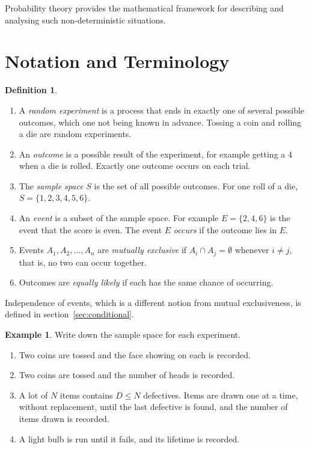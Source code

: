 \documentclass[12pt,a4paper]{report}
\theoremstyle{definition}
\newtheorem{definition}[thm]{Definition}
\newtheorem{example}[thm]{Example}
\theoremstyle{plain}
\theoremstyle{definition}
\begin{document}
Probability theory provides the mathematical framework for describing and
analysing such non-deterministic situations.

\section{Notation and Terminology}

\begin{definition}
\label{def:terms}
\begin{enumerate}
\item A \emph{random experiment} is a process that ends in exactly one of several
possible outcomes, which one not being known in advance. Tossing a coin and rolling
a die are random experiments.
\item An \emph{outcome} is a possible result of the experiment, for example getting
a $4$ when a die is rolled. Exactly one outcome occurs on each trial.
\item The \emph{sample space} $S$ is the set of all possible outcomes. For one roll of
a die, $S = \{1, 2, 3, 4, 5, 6\}$.
\item An \emph{event} is a subset of the sample space. For example
$E = \{2, 4, 6\}$ is the event that the score is even. The event $E$
\emph{occurs} if the outcome lies in $E$.
\item Events $A_1, A_2, \dots, A_n$ are \emph{mutually exclusive} if
$A_i\cap A_j = \emptyset$ whenever $i\ne j$, that is, no two can occur together.
\item Outcomes are \emph{equally likely} if each has the same chance of occurring.
\end{enumerate}
\end{definition}

Independence of events, which is a different notion from mutual exclusiveness, is
defined in section~\ref{sec:conditional}.

\begin{example}
\label{ex:samplespaces}
Write down the sample space for each experiment.
\begin{enumerate}
\item Two coins are tossed and the face showing on each is recorded.
\item Two coins are tossed and the number of heads is recorded.
\item A lot of $N$ items contains $D\le N$ defectives. Items are drawn one at a time,
without replacement, until the last defective is found, and the number of items
drawn is recorded.
\item A light bulb is run until it fails, and its lifetime is recorded.
\end{enumerate}
\end{example}
\end{document}
